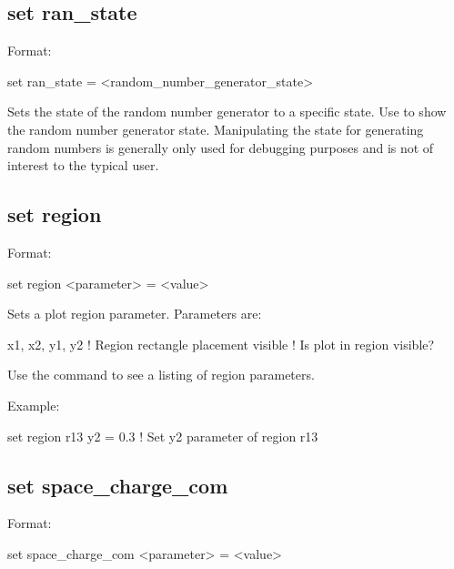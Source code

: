 {{{{{%

\subsection{set ran\_state}
\label{s:set.ran.state}

Format:
\begin{example}
  set ran_state = <random_number_generator_state>
\end{example}

Sets the state of the random number generator to a specific state. Use 
to show the random number generator state. Manipulating the state for generating random numbers is
generally only used for debugging purposes and is not of interest to the typical user.


\subsection{set region}
\label{s:set.region}

Format:
\begin{example}
  set region <parameter> = <value>
\end{example}

Sets a plot region parameter. Parameters are:
\begin{example}
  x1, x2, y1, y2    ! Region rectangle placement
  visible           ! Is plot in region visible?
\end{example}

Use the  command to see a listing of region parameters.

Example:
\begin{example}
  set region r13 y2 = 0.3  ! Set y2 parameter of region r13
\end{example}


\subsection{set space_charge_com}
\label{s:set.sc.com}

Format:
\begin{example}
  set space_charge_com <parameter> = <value>
\end{example}

}}}}}
